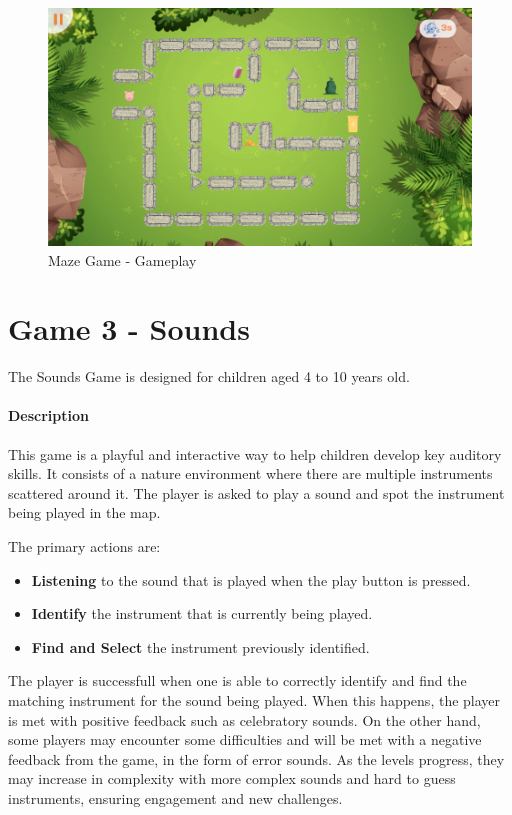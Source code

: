 \begin{figure}[H]
    \centering
    \includegraphics[scale=0.45]{Chapters/gameplay/MazeGame.jpg}
    \caption{Maze Game - Gameplay}
    \label{fig:mazeGameplay}    
\end{figure}

\newpage
\section{Game 3 - Sounds}

The Sounds Game is designed for children aged 4 to 10 years old.

\paragraph{Description}
This game is a playful and interactive way to help children develop key auditory skills. It consists of a nature environment where there are multiple instruments scattered around it. The player is asked to play a sound and spot the instrument being played in the map.

The primary actions are:

\begin{itemize}
    \item \textbf{Listening} to the sound that is played when the play button is pressed.
    \item \textbf{Identify} the instrument that is currently being played.
    \item \textbf{Find and Select} the instrument previously identified. 
\end{itemize}


The player is successfull when one is able to correctly identify and find the matching instrument for the sound being played. When this happens, the player is met with positive feedback such as celebratory sounds. On the other hand, some players may encounter some difficulties and will be met with a negative feedback from the game, in the form of error sounds.
As the levels progress, they may increase in complexity with more complex sounds and hard to guess instruments, ensuring engagement and new challenges.

